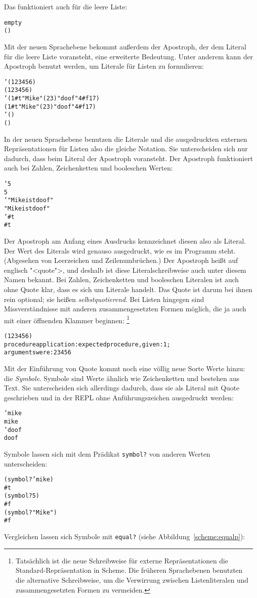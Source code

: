 Das funktioniert auch für die leere Liste:
%
\begin{alltt}
empty
\evalsto{} ()
\end{alltt}
%
Mit der neuen Sprachebene bekommt außerdem der Apostroph, der dem
Literal für die leere Liste voransteht, eine erweiterte Bedeutung.
Unter anderem kann der Apostroph benutzt werden, um Literale für
Listen zu formulieren:
%
\begin{alltt}
'(1 2 3 4 5 6)
\evalsto{} (1 2 3 4 5 6)
'(1 #t "Mike" (2 3) "doof" 4 #f 17)
\evalsto{} (1 #t "Mike" (2 3) "doof" 4 #f 17)
'()
\evalsto{} ()
\end{alltt}
%
In der neuen Sprachebene benutzen die Literale und die ausgedruckten
externen Repräsentationen für Listen also die gleiche
Notation.  Sie unterscheiden sich nur dadurch,
dass beim Literal der Apostroph voransteht.  Der Apostroph funktioniert
auch bei Zahlen, Zeichenketten und booleschen Werten:
%
\begin{alltt}
'5
\evalsto{} 5
'"Mike ist doof"
\evalsto{} "Mike ist doof"
'#t
\evalsto{} #t
\end{alltt}
%
Der Apostroph am Anfang eines Ausdrucks
kennzeichnet diesen also als Literal.  Der Wert des Literals wird 
genauso ausgedruckt, wie es im Programm steht.  (Abgesehen von
Leerzeichen und Zeilenumbrüchen.)  Der Apostroph heißt auf englisch
"<quote">, und deshalb ist diese
Literalschreibweise auch unter diesem Namen bekannt.  Bei Zahlen,
Zeichenketten und booleschen Literalen ist auch ohne Quote klar, dass
es sich um Literale handelt.  Das Quote ist darum bei ihnen rein
optional; sie heißen 
\textit{selbstquotierend}.
Bei Listen hingegen sind Missverständnisse mit anderen
zusammengesetzten Formen möglich, die ja auch mit einer öffnenden Klammer
beginnen: \footnote{Tatsächlich ist die neue Schreibweise für externe
  Repräsentationen die Standard-Repräsentation in Scheme.  Die
  früheren Sprachebenen benutzten die alternative Schreibweise, um die
  Verwirrung zwischen Listenliteralen und zusammengesetzten Formen zu
  vermeiden.}
\begin{alltt}
(1 2 3 4 5 6)
\evalsto{} procedure application: expected procedure, given: 1;
     arguments were: 2 3 4 5 6
\end{alltt}
%
Mit der Einführung von Quote kommt noch eine völlig neue Sorte Werte
hinzu: die \textit{Symbole}.  Symbole sind Werte ähnlich wie Zeichenketten und
bestehen aus Text.  Sie unterscheiden sich allerdings dadurch, dass sie
als Literal mit Quote geschrieben und in der REPL ohne
Anführungszeichen ausgedruckt werden:
%
\begin{alltt}
'mike
\evalsto{} mike
'doof
\evalsto{} doof
\end{alltt}
%
Symbole lassen sich mit dem Prädikat
\texttt{symbol?} von anderen Werten
unterscheiden:
%
\begin{alltt}
(symbol? 'mike)
\evalsto{} #t
(symbol? 5)
\evalsto{} #f
(symbol? "Mike")
\evalsto{} #f
\end{alltt}
%
Vergleichen lassen sich Symbole mit \texttt{equal?} (siehe
Abbildung~\ref{scheme:equalp}):

